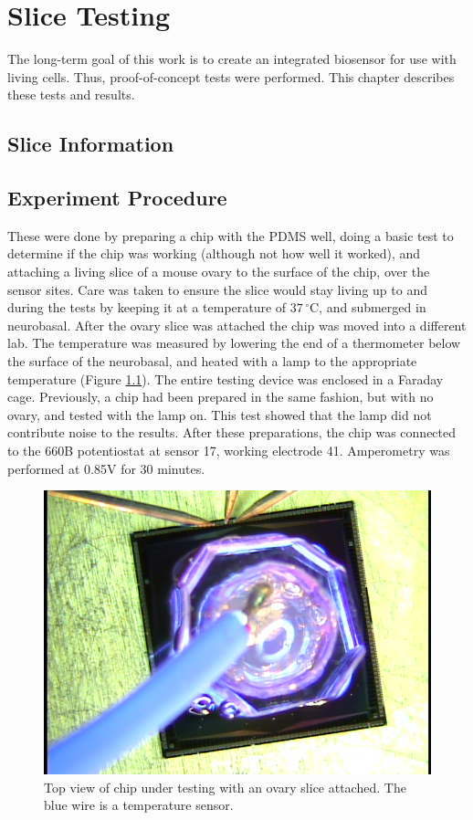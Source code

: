 \chapter{Slice Testing}

The long-term goal of this work is to create an integrated biosensor for use with living cells. Thus, proof-of-concept tests were performed. This chapter describes these tests and results.

\section{Slice Information}

\section{Experiment Procedure}

These were done by preparing a chip with the PDMS well, doing a basic test to determine if the chip was working (although not how well it worked), and attaching a living slice of a mouse ovary to the surface of the chip, over the sensor sites. Care was taken to ensure the slice would stay living up to and during the tests by keeping it at a temperature of $37\,^{\circ}\mathrm{C}$, and submerged in neurobasal. After the ovary slice was attached the chip was moved into a different lab. The temperature was measured by lowering the end of a thermometer below the surface of the neurobasal, and heated with a lamp to the appropriate temperature (Figure \ref{slice-top}). The entire testing device was enclosed in a Faraday cage. Previously, a chip had been prepared in the same fashion, but with no ovary, and tested with the lamp on. This test showed that the lamp did not contribute noise to the results. After these preparations, the chip was connected to the 660B potentiostat at sensor 17, working electrode 41. Amperometry was performed at 0.85V for 30 minutes.

\begin{figure}
	\centering
	\includegraphics[width=0.5\linewidth]{figures/slice-top.png}
	\caption[Top view of chip under testing with an ovary slice attached]{Top view of chip under testing with an ovary slice attached. The blue wire is a temperature sensor.}
	\label{slice-top}
\end{figure}

